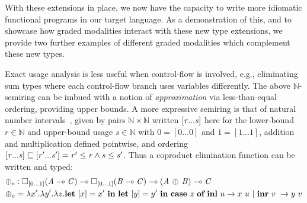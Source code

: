  With these extensions in place, we now have the
 capacity to write more idiomatic functional programs in our target language.
 As a demonstration of this, and to showcase how graded modalities interact with
 these new type extensions, we provide two further examples of different graded
 modalities which complement these new types.

\begin{example}%
\label{exm:or3}
Exact usage analysis is less useful when control-flow is involved, e.g.,
eliminating sum types where each control-flow branch
uses variables differently. The above $\mathbb{N}$-semiring can be imbued with
a notion of \emph{approximation} via less-than-equal ordering, providing
upper bounds. A more expressive semiring is that of
natural number intervals~\cite{DBLP:journals/pacmpl/OrchardLE19}, given by pairs
$\mathbb{N} \times \mathbb{N}$ written $[  \mathit{r}  ...  \mathit{s}  ]$ here for
the lower-bound $r \in \mathbb{N}$ and upper-bound usage $s \in
\mathbb{N}$ with $0 = [   0   ...   0   ]$ and $1 = [   1   ...   1   ]$,
addition and multiplication defined pointwise,
and ordering $[  \mathit{r}  ...  \mathit{s}  ] \sqsubseteq [  \mathit{r'}  ...  \mathit{s'}  ] = \mathit{r'} \leq \mathit{r}
\wedge \mathit{s} \leq \mathit{s'}$. Thus a coproduct elimination function
can be written and typed:
%
\begin{align*}
\oplus_e & : \Box_{    [   0   ...   1   ]    }  (   \mathit{A}  \multimap  \mathit{C}   )    \multimap      \Box_{    [   0   ...   1   ]    }  (   \mathit{B}  \multimap  \mathit{C}   )    \multimap    (   \mathit{A}  \, \oplus \,  \mathit{B}   )  \multimap  \mathit{C} \\
\oplus_e & =
\lambda x' . \lambda y' . \lambda z. \textbf{let}\ [x] = x'\ \textbf {in}\
\textbf{let}\ [y] = y'\ \textbf{in}\ \textbf{case}\ z\ \textbf{of}\
\textbf{inl}\ u \rightarrow x\ u\ |\ \textbf{inr}\ v\ \rightarrow y\ v
\end{align*}
\end{example}

